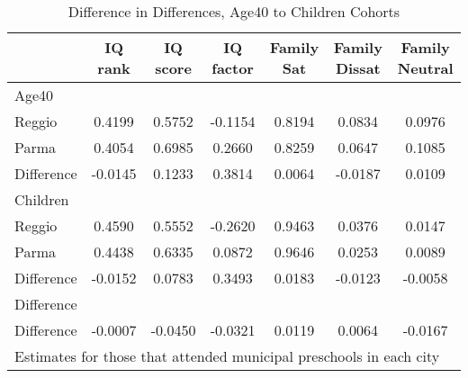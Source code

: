 \begin{table}[htbp]\centering
\caption{Difference in Differences, Age40 to Children Cohorts}
\begin{tabular}{l*{6}{c}}
\hline\hline
            &     IQ rank&    IQ score&   IQ factor&  Family Sat&Family Dissat&Family Neutral\\
\hline
Age40       &            &            &            &            &            &            \\
Reggio      &      0.4199&      0.5752&     -0.1154&      0.8194&      0.0834&      0.0976\\
Parma       &      0.4054&      0.6985&      0.2660&      0.8259&      0.0647&      0.1085\\
Difference  &     -0.0145&      0.1233&      0.3814&      0.0064&     -0.0187&      0.0109\\
\hline
Children    &            &            &            &            &            &            \\
Reggio      &      0.4590&      0.5552&     -0.2620&      0.9463&      0.0376&      0.0147\\
Parma       &      0.4438&      0.6335&      0.0872&      0.9646&      0.0253&      0.0089\\
Difference  &     -0.0152&      0.0783&      0.3493&      0.0183&     -0.0123&     -0.0058\\
\hline
Difference  &            &            &            &            &            &            \\
Difference  &     -0.0007&     -0.0450&     -0.0321&      0.0119&      0.0064&     -0.0167\\
\hline\hline
\multicolumn{7}{l}{\footnotesize Estimates for those that attended municipal preschools in each city}\\
\end{tabular}
\end{table}
